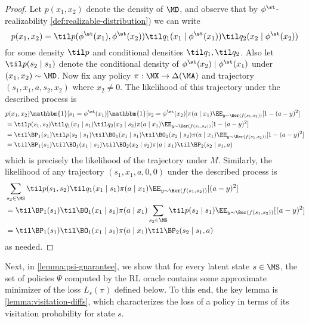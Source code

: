 \begin{proof}
Let $p(x_1,x_2)$ denote the density of $\MD$, and observe that by $\phi^\st$-realizability \cref{def:realizable-distribution}) we can write
\[p(x_1,x_2) = \til p(\phi^\st(x_1),\phi^\st(x_2)) \til q_1(x_1\mid{}\phi^\st(x_1)) \til q_2(x_2\mid{}\phi^\st(x_2))\]
for some density $\til p$ and conditional densities $\til q_1,\til q_2$. Also let $\til p(s_2\mid{}s_1)$ denote the conditional density of $\phi^\st(x_2)\mid{}\phi^\st(x_1)$ under $(x_1,x_2) \sim \MD$. Now fix any policy $\pi:\MX \to \Delta(\MA)$ and trajectory $(s_1,x_1,a,s_2,x_2)$ where $x_2 \neq 0$. The likelihood of this trajectory under the described process is
\begin{align*}
&p(x_1,x_2) \mathbbm{1}[s_1=\phi^\st(x_1)]\mathbbm{1}[s_2=\phi^\st(x_2)] \pi(a\mid{}x_1) \EE_{y \sim \Ber(f(s_1,s_2))}[1 - (a - y)^2] \\ 
&= \til p(s_1,s_2) \til q_1(x_1\mid{}s_1) \til q_2(x_2\mid{}s_2) \pi(a\mid{}x_1)  \EE_{y \sim \Ber(f(s_1,s_2))}[1 - (a - y)^2] \\ 
&= \til\BP_1(s_1) \til p(s_2\mid{}s_1) \til\BO_1(x_1\mid{}s_1) \til\BO_2(x_2\mid{}s_2)\pi(a\mid{}x_1) \EE_{y \sim \Ber(f(s_1,s_2))}[1 - (a - y)^2] \\ 
&= \til\BP_1(s_1) \til\BO_1(x_1\mid{}s_1)\til\BO_2(x_2\mid{}s_2)\pi(a\mid{}x_1) \til\BP_2(s_2\mid{}s_1,a)
\end{align*}
which is precisely the likelihood of the trajectory under $M$. Similarly, the likelihood of any trajectory $(s_1,x_1,a,0,0)$ under the described process is
\begin{align*}
&\sum_{s_2 \in \MS} \til p(s_1,s_2) \til q_1(x_1\mid{}s_1) \pi(a\mid{}x_1) \EE_{y \sim \Ber(f(s_1,s_2))}[(a-y)^2] \\ 
&= \til\BP_1(s_1)\til\BO_1(x_1\mid{}s_1) \pi(a\mid{}x_1) \sum_{s_2 \in \MS} \til p(s_2\mid{}s_1) \EE_{y \sim \Ber(f(s_1,s_2))}[(a-y)^2] \\ 
&= \til\BP_1(s_1)\til\BO_1(x_1\mid{}s_1) \pi(a\mid{}x_1)\til \BP_2(s_2\mid{}s_1,a)
\end{align*}
as needed.
\end{proof}

Next, in \cref{lemma:psi-guarantee}, we show that for every latent state $s \in \MS$, the set of policies $\Psi$ computed by the RL oracle contains some approximate minimizer of the loss $L_s(\pi)$ defined below. To this end, the key lemma is \cref{lemma:visitation-diffs}, which characterizes the loss of a policy in terms of its visitation probability for state $s$.

